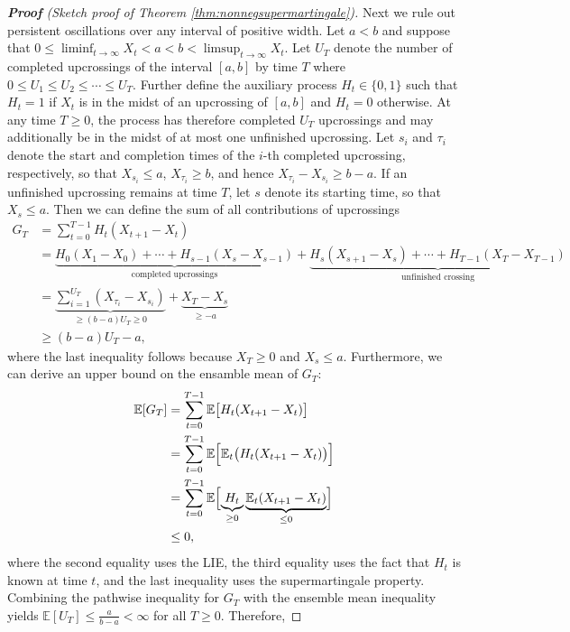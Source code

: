 \documentclass[12pt]{article}
\begin{document}
\begin{proof}[\textbf{Proof} (Sketch proof of Theorem \ref{thm:nonnegsupermartingale})]
Next we rule out persistent oscillations over any interval of positive width. Let $a<b$ 
and suppose that $0\leq\liminf_{t\to\infty}X_t<a<b<\limsup_{t\to\infty}X_t$. Let 
$U_T$ denote the number of completed upcrossings of the interval $[a,b]$ by time $T$ where 
$0\leq U_1\leq U_2\leq\cdots\leq U_T$. 
Further define the auxiliary process $H_t\in\{0,1\}$ such that $H_t=1$ if $X_t$ is in the 
midst of an upcrossing of $[a,b]$ and $H_t=0$ otherwise. At any time $T\geq0$, 
the process has therefore completed $U_T$ upcrossings and may additionally be in the 
midst of at most one unfinished upcrossing. Let $s_i$ and $\tau_i$ denote the start and 
completion times of the $i$-th completed upcrossing, respectively, so that $X_{s_i}\leq a$, 
$X_{\tau_i}\geq b$, and hence $X_{\tau_i}-X_{s_i}\geq b-a$. If an unfinished upcrossing 
remains at time $T$, let $s$ denote its starting time, so that $X_s\leq a$. Then
we can define the sum of all contributions of upcrossings 
{\footnotesize
\begin{align*}
    G_T&=\sum_{t=0}^{T-1}H_t(X_{t+1}-X_t) \\
    &= \underbrace{H_0(X_1-X_0)+\cdots+H_{s-1}(X_s-X_{s-1})}_{\text{completed upcrossings}} 
        + \underbrace{H_s(X_{s+1}-X_s)+\cdots+H_{T-1}(X_T-X_{T-1})}_{\text{unfinished crossing}} \\
    &= \underbrace{\sum_{i=1}^{U_T} (X_{\tau_i}-X_{s_i})}_{\geq (b-a)U_T\geq0} 
        + \underbrace{X_{T}-X_{s}}_{\geq-a} \\
    &\geq (b-a)U_T - a,
\end{align*}
}%
where the last inequality follows because $X_T\geq0$ and $X_s\leq a$. Furthermore, we can derive 
an upper bound on the ensamble mean of $G_T$: 
\begin{align*}
    \mathbb{E}[G_T] &= \sum_{t=0}^{T-1} \mathbb{E}\bigl[H_t(X_{t+1}-X_t)\bigr] \\
    &= \sum_{t=0}^{T-1}\mathbb{E}\Bigl[\mathbb{E}_t\bigl(H_t(X_{t+1}-X_t)\bigr)\Bigr] \\
    &= \sum_{t=0}^{T-1}\mathbb{E}
        \Bigl[
        \underbrace{H_t}_{\geq0} 
        \underbrace{\mathbb{E}_t(X_{t+1}-X_t)}_{\leq 0}
        \Bigr] \\
    &\leq 0,
\end{align*}
where the second equality uses the LIE, the third equality uses the fact that $H_t$ is 
known at time $t$, and the last inequality uses the supermartingale property. 
Combining the pathwise inequality for $G_T$ with the ensemble mean inequality yields
$\mathbb{E}[U_T] \leq \frac{a}{b-a} < \infty$ for all $T\geq0$. Therefore, 

\end{proof}
\end{document}
